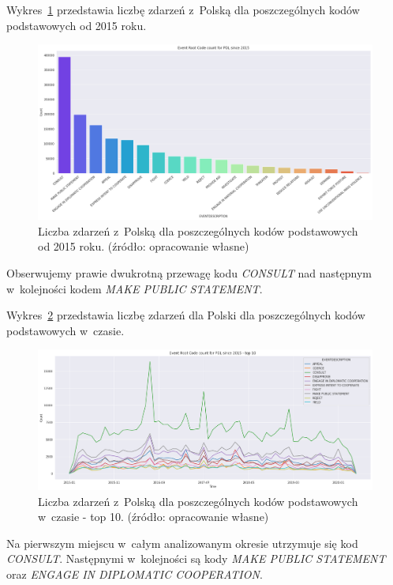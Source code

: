 \documentclass[11pt]{report}
\begin{document}
    Wykres~\ref{fig:PLPERC} przedstawia liczbę zdarzeń z~Polską dla poszczególnych kodów podstawowych od 2015 roku.
    \begin{figure}[!htp]
        \centering
        \includegraphics[width=\linewidth]{fig/PL/PLERC.png}
        \caption{Liczba zdarzeń z~Polską dla poszczególnych kodów podstawowych od 2015 roku. (źródło: opracowanie własne)}
        \label{fig:PLPERC}
    \end{figure}
    Obserwujemy prawie dwukrotną przewagę kodu \textit{CONSULT} nad następnym w~kolejności kodem \textit{MAKE PUBLIC STATEMENT}.

    Wykres~\ref{fig:PLPERCinTIME} przedstawia liczbę zdarzeń dla Polski dla poszczególnych kodów podstawowych w~czasie.
    \begin{figure}[!htp]
        \centering
        \includegraphics[width=\linewidth]{fig/PL/PLERCinTIME.png}
        \caption{Liczba zdarzeń z~Polską dla poszczególnych kodów podstawowych w~czasie - top 10. (źródło: opracowanie własne)}
        \label{fig:PLPERCinTIME}
    \end{figure}
    Na pierwszym miejscu w~całym analizowanym okresie utrzymuje się kod \textit{CONSULT}.
    Następnymi w~kolejności są kody \textit{MAKE PUBLIC STATEMENT} oraz \textit{ENGAGE IN DIPLOMATIC COOPERATION}.
\end{document}
